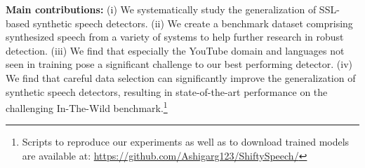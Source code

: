 \textbf{Main contributions:} (i) We systematically study the generalization of SSL-based synthetic speech detectors. (ii) We create a benchmark dataset comprising synthesized speech from a variety of systems to help further research in robust detection. (iii) We find that especially the YouTube domain and languages not seen in training pose a significant challenge to our best performing detector. (iv) We find that careful data selection can significantly improve the generalization of synthetic speech detectors, resulting in state-of-the-art performance on the challenging In-The-Wild benchmark.\footnote{Scripts to reproduce our experiments as well as to download trained models are available at: \url{https://github.com/Ashigarg123/ShiftySpeech/}}
